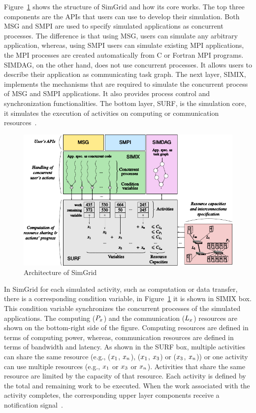 Figure~\ref{fig:SimGrid} shows the structure of SimGrid and how its core works. The top three components are the APIs that users can use to develop their simulation. Both MSG and SMPI are used to specify simulated applications as concurrent processes. The difference is that using MSG, users can simulate any arbitrary application, whereas, using SMPI users can simulate existing MPI applications, the MPI processes are created automatically from C or Fortran MPI programs. SIMDAG, on the other hand, does not use concurrent processes. It allows users to describe their application as communicating task graph. The next layer, SIMIX, implements the mechanisms that are required to simulate the concurrent process of MSG and SMPI applications. It also provides process control and synchronization functionalities. The bottom layer, SURF, is the simulation core, it simulates the execution of activities on computing or communication resources~\cite{DBLP:journals/jpdc/CasanovaGLQS14}.
\begin{figure}[ht]
	\begin{center}
		\includegraphics{images/SimGrid.pdf}
		\caption{Architecture of SimGrid \cite{DBLP:journals/jpdc/CasanovaGLQS14}}
		\label{fig:SimGrid}
	\end{center}
\end{figure}

In SimGrid for each simulated activity, such as computation or data transfer, there is a corresponding condition variable, in Figure~\ref{fig:SimGrid} it is shown in SIMIX box. This condition variable synchronizes the concurrent processes of the simulated applications. The computing (\($$P_{x}$$\)) and the communication (\($$L_{x}$$\)) resources are shown on the bottom-right side of the figure. Computing resources are defined in terms of computing power, whereas, communication resources are defined in terms of bandwidth and latency. As shown in the SURF box, multiple activities can share the same resource (e.g., (\($$x_{1}$$\), \($$x_{n}$$\)), (\($$x_{1}$$\), \($$x_{3}$$\)) or (\($$x_{3}$$\), \($$x_{n}$$\))) or one activity can use multiple resources (e.g., \($$x_{1}$$\) or \($$x_{3}$$\) or  \($$x_{n}$$\)). Activities that share the same resource are limited by the capacity of that resource. Each activity is defined by the total and remaining work to be executed. When the work associated with the activity completes, the corresponding upper layer components receive a notification signal~\cite{DBLP:journals/jpdc/CasanovaGLQS14}.

